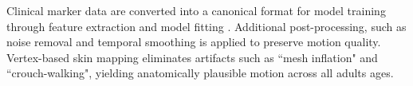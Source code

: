 Clinical marker data are converted into a canonical format for model training through feature extraction and model fitting \cite{mahmood2019amass}. Additional post-processing, such as noise removal and temporal smoothing is applied to preserve motion quality. Vertex-based skin mapping eliminates artifacts such as ``mesh inflation" and ``crouch-walking", yielding anatomically plausible motion across all adults ages.